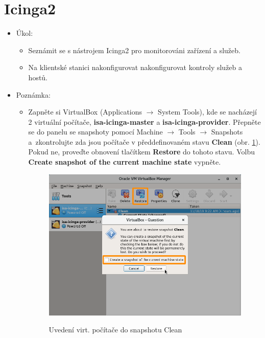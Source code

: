 \section{Icinga2}
  \begin{itemize}
    \item Úkol: 
    \begin{itemize}
      \item Seznámit se s nástrojem Icinga2 pro monitorováni zařízení a služeb.
      \item Na klientské stanici nakonfigurovat nakonfigurovat kontroly služeb a hostů.  
    \end{itemize}
    \item Poznámka:
        \begin{itemize}
	        \item Zapněte si VirtualBox (Applications $\rightarrow$ System Tools), kde se nacházejí 2 virtuální počítače, {\bf isa-icinga-master} a {\bf isa-icinga-provider}. Přepněte se do panelu se snapshoty pomocí Machine $\rightarrow$ Tools $\rightarrow$ Snapshots a~zkontrolujte zda jsou počítače v předdefinovaném stavu {\bf Clean} (obr. \ref{fig:revert}). Pokud ne, proveďte obnovení tlačítkem {\bf Restore} do tohoto stavu. Volbu {\bf Create snapshot of the current machine state} vypněte.
            
            \begin{figure}[!ht]
            	\caption{Uvedení virt. počítače do snapshotu Clean}
            	\centering
            	\includegraphics[width=0.67\linewidth]{files/vbox-revert.png}
            	\label{fig:revert}
            \end{figure}
            

\end{itemize}
\end{itemize}
